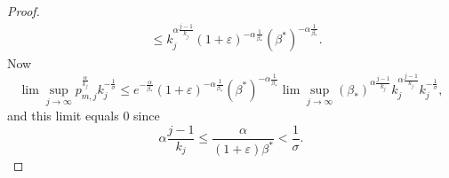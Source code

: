 \documentclass[10pt,a4paper]{amsart}
\begin{document}
\begin{proof}
\begin{align*}
		&  \leq k_{j}^{\alpha\frac{j-1}{k_{j}}}\left(  1+\varepsilon\right)
		^{-\alpha\frac{1}{\beta_{\ast}}}\left(  \beta^{\ast}\right)  ^{-\alpha\frac
			{1}{\beta_{\ast}}}.
	\end{align*}
	Now
	\[
	\lim\sup_{j\rightarrow\infty}p_{m,j}^{\frac{\alpha}{k_{j}}}k_{j}^{-\frac{1}{\sigma}
	}
	\leq 
	e^{-\frac{\alpha}{\beta_{\ast}}}\left(  1+\varepsilon\right)
	^{-\alpha\frac{1}{\beta_{\ast}}}\left(  \beta^{\ast}\right)  ^{-\alpha\frac
		{1}{\beta_{\ast}}}
	\lim\sup_{j\rightarrow\infty}
	\left(  \beta_{\ast}\right)^{\alpha
		\frac{j-1}{k_{j}}}
	k_{j}^{\alpha\frac{j-1}{k_{j}}
	}k_{j}^{-\frac{1}{\sigma}},
	\]
	and this limit equals $0$ since
	\[
	\alpha\frac{j-1}{k_{j}}
	\leq
	\frac{\alpha}{\left(
		1+\varepsilon\right)  \beta^{\ast}}
	< \frac{1}{\sigma}.
	\]
	\end{proof}
\end{document}
